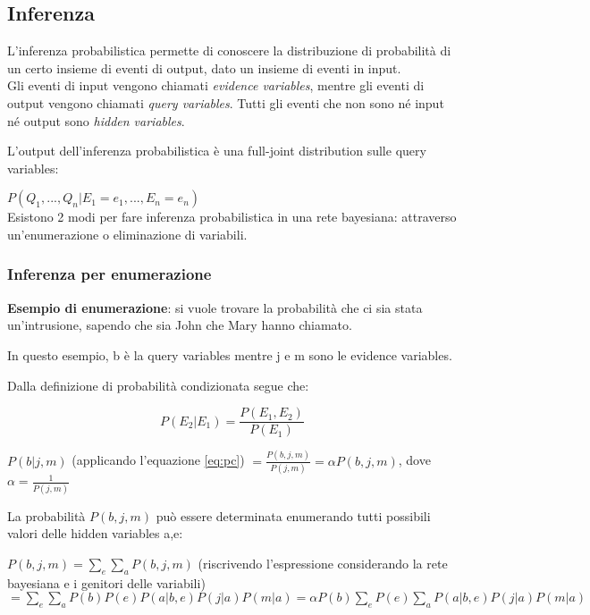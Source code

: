 \subsection{Inferenza}

L'inferenza probabilistica permette di conoscere la distribuzione di
probabilità di un certo insieme di eventi di output, dato un insieme di
eventi in input.\\

Gli eventi di input vengono chiamati \textit{evidence variables}, mentre
gli eventi di output vengono chiamati \textit{query variables}. Tutti gli
eventi che non sono né input né output sono \textit{hidden variables}.

L'output dell'inferenza probabilistica è una full-joint distribution
sulle query variables:

$P(Q_1,..., Q_n| E_1 = e_1,..., E_n = e_n)$\\

Esistono 2 modi per fare inferenza probabilistica in una rete bayesiana:
attraverso un'enumerazione o eliminazione di variabili.\\

\subsubsection{Inferenza per enumerazione}

\textbf{Esempio di enumerazione}: si vuole trovare la probabilità che ci
sia stata un'intrusione, sapendo che sia John che Mary hanno chiamato.

In questo esempio, b è la query variables mentre j e m sono le evidence
variables.

Dalla definizione di probabilità condizionata segue che:

\begin{equation}
\label{eq:pc}
P(E_2|E_1) = \frac{P(E_1, E_2)}{P(E_1)}
\end{equation}

$P(b|j,m)$ (applicando l'equazione \ref{eq:pc}) $= \frac{P(b,j,m)}{P(j,m)} =
\alpha P(b,j,m)$, dove $\alpha = \frac{1}{P(j,m)}$

La probabilità $P(b,j,m)$ può essere determinata enumerando tutti possibili
valori delle hidden variables a,e:

$P(b,j,m) = \sum_e \sum_a P(b,j,m)$ (riscrivendo l'espressione considerando
la rete bayesiana e i genitori delle variabili) $= \sum_e \sum_a P(b)P(e)
P(a|b,e)P(j|a)P(m|a) = \alpha P(b) \sum_e P(e) \sum_a P(a|b,e)P(j|a)P(m|a)$

